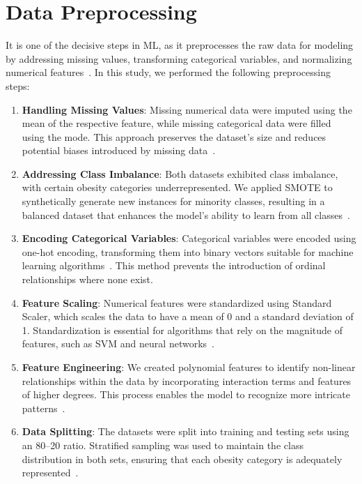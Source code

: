 \documentclass[12pt, a4paper]{article}
\begin{document}
\section{Data Preprocessing}

It is one of the decisive steps in ML, as it preprocesses the raw data for modeling by
addressing missing values, transforming categorical variables, and normalizing numerical
features~\cite{kotsiantis2006}. In this study, we performed the following preprocessing
steps:

\begin{enumerate}[label=\textbf{\alph*.}]
  \item \textbf{Handling Missing Values}: Missing numerical data were imputed using the
        mean of the respective feature, while missing categorical data were filled using
        the mode. This approach preserves the dataset's size and reduces potential biases
        introduced by missing data~\cite{guyon2002}.

  \item \textbf{Addressing Class Imbalance}: Both datasets exhibited class imbalance,
        with certain obesity categories underrepresented. We applied SMOTE to
        synthetically generate new instances for minority classes, resulting in a
        balanced dataset that enhances the model's ability to learn from all
        classes~\cite{chawla2002}.

  \item \textbf{Encoding Categorical Variables}: Categorical variables were encoded
        using one-hot encoding, transforming them into binary vectors suitable for
        machine learning algorithms~\cite{pedregosa2011}. This method prevents the
        introduction of ordinal relationships where none exist.

  \item \textbf{Feature Scaling}: Numerical features were standardized using Standard
        Scaler, which scales the data to have a mean of 0 and a standard deviation of 1.
        Standardization is essential for algorithms that rely on the magnitude of
        features, such as SVM and neural networks~\cite{jain2000}.

  \item \textbf{Feature Engineering}: We created polynomial features to identify
        non-linear relationships within the data by incorporating interaction terms and
        features of higher degrees. This process enables the model to recognize more
        intricate patterns~\cite{rumelhart1986}.

  \item \textbf{Data Splitting}: The datasets were split into training and testing sets
        using an 80--20 ratio. Stratified sampling was used to maintain the class
        distribution in both sets, ensuring that each obesity category is adequately
        represented~\cite{he2009}.
\end{enumerate}
\end{document}
